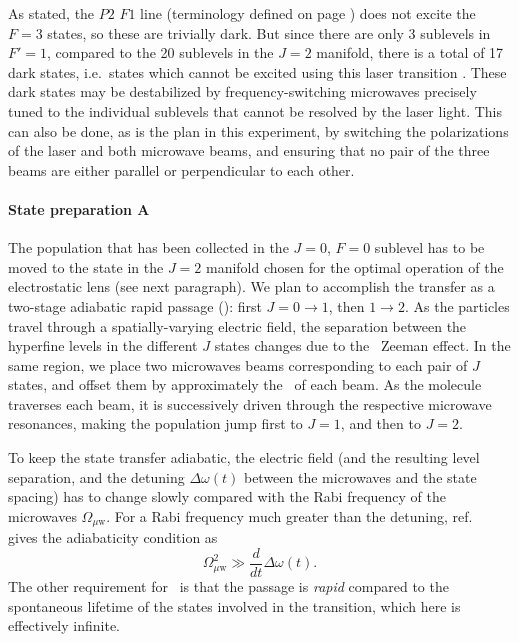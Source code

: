 As stated, the $P2$ $F1$ line (terminology defined on page \pageref{P2F1}) does
not excite the $F=3$ states, so these are trivially dark. But since there are
only 3 sublevels in $F'=1$, compared to the 20 sublevels in the $J=2$ manifold,
there is a total of 17 dark states, i.e.\ states which cannot be excited using
this laser transition \cite[sect~3.1.3]{barry2013thesis}. These dark states may
be destabilized \cite{berkeland2002destabilization} by frequency-switching
microwaves precisely tuned to the individual sublevels that cannot be resolved
by the laser light. This can also be done, as is the plan in this experiment, by
switching the polarizations of the laser and both microwave beams, and ensuring
that no pair of the three beams are either parallel or perpendicular to each
other.

\paragraph{State preparation A}

The population that has been collected in the $J=0$, $F=0$ sublevel has to be
moved to the state in the $J=2$ manifold chosen for the optimal operation of the
electrostatic lens (see next paragraph). We plan to accomplish the transfer as a
two-stage adiabatic rapid passage (\ARP): first $J=0\to1$, then $1\to2$. As the
particles travel through a spatially-varying electric field, the separation
between the hyperfine levels in the different $J$ states changes due to the \DC\
Zeeman effect. In the same region, we place two microwaves beams corresponding
to each pair of $J$ states, and offset them by approximately the \FWHM\ of each
beam. As the molecule traverses each beam, it is successively driven through
the respective microwave resonances, making the population jump first to $J=1$,
and then to $J=2$.

To keep the state transfer adiabatic, the electric field (and the resulting
level separation, and the detuning $\Delta\omega(t)$ between the microwaves and
the state spacing) has to change slowly compared with the Rabi frequency of the
microwaves $\Omega_{\mu\text{w}}$. For a Rabi frequency much greater than the
detuning, ref.~\cite{malinovsky2001general} gives the adiabaticity condition as
%
\[
\Omega^2_{\mu\text{w}}\gg\frac{d}{dt}\Delta\omega(t).
\]
%
The other requirement for \ARP\ is that the passage is \emph{rapid} compared to
the spontaneous lifetime of the states involved in the transition, which here is
effectively infinite. \cite{shore2009simple}

